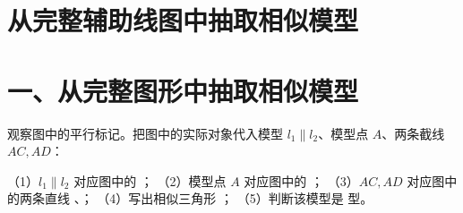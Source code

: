 \documentclass{exam-zh}
\begin{document}
\section*{从完整辅助线图中抽取相似模型}

\section*{一、从完整图形中抽取相似模型}


\begin{problem}[points=10]
  \noindent
  \begin{minipage}[t]{\dimexpr\linewidth-60mm-6mm\relax}
    \vspace{0pt}
    观察图中的平行标记。把图中的实际对象代入模型 $l_1\parallel l_2$、模型点 $A$、两条截线 $AC,AD$：

（1）$l_1\parallel l_2$ 对应图中的 \underline{\hspace{2cm}}；
（2）模型点 $A$ 对应图中的 \underline{\hspace{1cm}}；
（3）$AC,AD$ 对应图中的两条直线 \underline{\hspace{1.8cm}}、\underline{\hspace{1.8cm}}；
（4）写出相似三角形 \underline{\hspace{4cm}}；
（5）判断该模型是 \underline{\hspace{1.5cm}} 型。


  \end{minipage}\hfill
  \begin{diagramcoltikz}{60mm}{第 1 题图}
  }
  \end{diagramcoltikz}
  \par\medskip
  \answerarea[34mm]
\end{problem}


\end{document}
